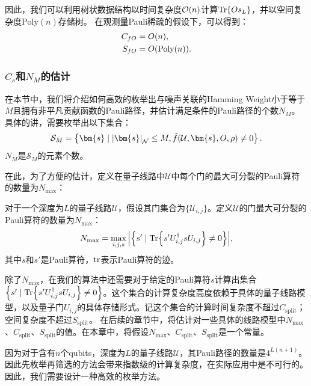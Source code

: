 因此，我们可以利用树状数据结构以时间复杂度$\order{n}$计算$\Tr{O s_L}$，并以空间复杂度$\mathrm{Poly}(n)$存储树。
在观测量Pauli稀疏的假设下，可以得到：
\begin{equation}\label{eq:cost_O}
    \begin{aligned}
        C_{fO}&=O(n),\\
        S_{fO}&=O(\text{Poly}(n)).
    \end{aligned}
\end{equation}



\subsubsection{$C_s$和$N_M$的估计}

在本节中，我们将介绍如何高效的枚举出与噪声关联的Hamming Weight小于等于$M$且拥有非平凡贡献函数的Pauli路径，并估计满足条件的Pauli路径的个数$N_M$。具体的讲，需要枚举出以下集合：
\begin{equation}
    \mathcal{S}_M = \left\{ \bm{s} \mid \abs{\bm{s}}_{\mathcal{N}}\leq M, \tilde{f}(\mathcal{U},\bm{s},O,\rho)\neq 0 \right\}.
\end{equation}
$N_M$是$\mathcal{S}_M$的元素个数。


在此，为了方便的估计，定义在量子线路中$\mathcal{U}$中每个门的最大可分裂的Pauli算符的数量为$N_{\text{max}}$：
\begin{definition}
    对于一个深度为$L$的量子线路$\mathcal{U}$，假设其门集合为$\{\mathcal{U}_{i,j}\}$。定义$\mathcal{U}$的门最大可分裂的Pauli算符的数量为$N_{\text{max}}$：
    \begin{equation}
        N_{\text{max}} = \max_{i,j,s}\abs{ \left\{ s'\mid \Tr{s' U^\dagger_{i,j}s U_{i,j}}\neq 0 \right\}},
    \end{equation}
    其中$s$和$s'$是Pauli算符，$\tr$表示Pauli算符的迹。 
\end{definition}
除了$N_{\text{max}}$，在我们的算法中还需要对于给定的Pauli算符$s$计算出集合$\left\{ s'\mid \Tr{s' U^\dagger_{i,j}s U_{i,j}}\neq 0 \right\}$。这个集合的计算复杂度高度依赖于具体的量子线路模型，以及量子门$U_{i,j}$的具体存储形式。记这个集合的计算时间复杂度不超过$C_{\text{split}}$；空间复杂度不超过$S_{\text{split}}$。
在后续的章节中，将估计对一些具体的线路模型中$N_{\text{max}}$、$C_{\text{split}}$、$S_{\text{split}}$的值。在本章中，将假设$N_{\text{max}}$、$C_{\text{split}}$、$S_{\text{split}}$是一个常量。

因为对于含有$n$个qubits，深度为$L$的量子线路$\mathcal{U}$，其Pauli路径的数量是$4^{L(n+1)}$。因此先枚举再筛选的方法会带来指数级的计算复杂度，在实际应用中是不可行的。因此，我们需要设计一种高效的枚举方法。

